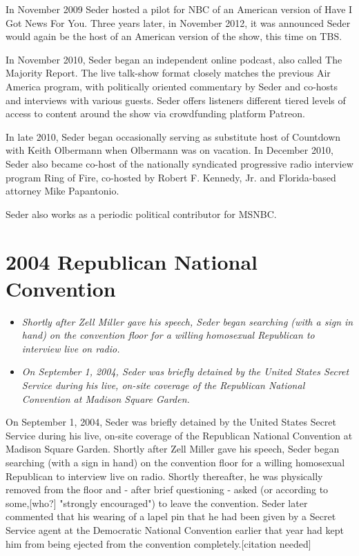In November 2009 Seder hosted a pilot for NBC of an American version of
Have I Got News For You. Three years later, in November 2012, it was
announced Seder would again be the host of an American version of the
show, this time on TBS.

In November 2010, Seder began an independent online podcast, also called
The Majority Report. The live talk-show format closely matches the
previous Air America program, with politically oriented commentary by
Seder and co-hosts and interviews with various guests. Seder offers
listeners different tiered levels of access to content around the show
via crowdfunding platform Patreon.

In late 2010, Seder began occasionally serving as substitute host of
Countdown with Keith Olbermann when Olbermann was on vacation. In
December 2010, Seder also became co-host of the nationally syndicated
progressive radio interview program Ring of Fire, co-hosted by Robert F.
Kennedy, Jr. and Florida-based attorney Mike Papantonio.

Seder also works as a periodic political contributor for MSNBC.

\section{2004 Republican National
Convention}\label{republican-national-convention}

\begin{itemize}
\item
  \emph{Shortly after Zell Miller gave his speech, Seder began searching
  (with a sign in hand) on the convention floor for a willing homosexual
  Republican to interview live on radio.}
\item
  \emph{On September 1, 2004, Seder was briefly detained by the United
  States Secret Service during his live, on-site coverage of the
  Republican National Convention at Madison Square Garden.}
\end{itemize}

On September 1, 2004, Seder was briefly detained by the United States
Secret Service during his live, on-site coverage of the Republican
National Convention at Madison Square Garden. Shortly after Zell Miller
gave his speech, Seder began searching (with a sign in hand) on the
convention floor for a willing homosexual Republican to interview live
on radio. Shortly thereafter, he was physically removed from the floor
and - after brief questioning - asked (or according to some,{[}who?{]}
"strongly encouraged") to leave the convention. Seder later commented
that his wearing of a lapel pin that he had been given by a Secret
Service agent at the Democratic National Convention earlier that year
had kept him from being ejected from the convention
completely.{[}citation needed{]}

